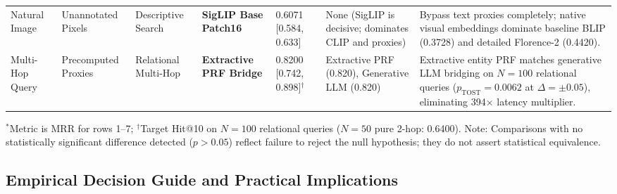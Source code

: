 \begin{table}[t]
\begin{tabular}{@{}p{1.6cm}p{1.8cm}p{1.8cm}p{2.1cm}p{1.8cm}p{2.3cm}p{4.1cm}@{}}
Natural Image & Unannotated Pixels & Descriptive Search & \textbf{SigLIP Base Patch16} & 0.6071 [0.584, 0.633] & None (SigLIP is decisive; dominates CLIP and proxies) & Bypass text proxies completely; native visual embeddings dominate baseline BLIP (0.3728) and detailed Florence-2 (0.4420). \\
Multi-Hop Query & Precomputed Proxies & Relational Multi-Hop & \textbf{Extractive PRF Bridge} & 0.8200 [0.742, 0.898]$^\dagger$ & Extractive PRF (0.820), Generative LLM (0.820) & Extractive entity PRF matches generative LLM bridging on $N=100$ relational queries ($p_{\text{TOST}}=0.0062$ at $\Delta=\pm 0.05$), eliminating 394$\times$ latency multiplier. \\
\bottomrule
\end{tabular}
\vspace{0mm}\newline
\raggedright\scriptsize $^*$Metric is MRR for rows 1--7; $^\dagger$Target Hit@10 on $N=100$ relational queries ($N=50$ pure 2-hop: 0.6400). Note: Comparisons with no statistically significant difference detected ($p > 0.05$) reflect failure to reject the null hypothesis; they do not assert statistical equivalence.
\end{table}

\subsection{Empirical Decision Guide and Practical Implications}
\label{sec:practical_implications}


